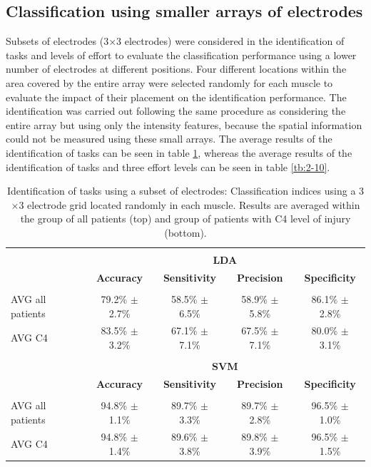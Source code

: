 \subsection{Classification using smaller arrays of electrodes}
Subsets of electrodes (3$\times$3 electrodes) were considered in the identification of tasks and levels of effort to evaluate the classification performance using a lower number of electrodes at different positions. Four different locations within the area covered by the entire array were selected randomly for each muscle to evaluate the impact of their placement on the identification performance. The identification was carried out following the same procedure as considering the entire array but using only the intensity features, because the spatial information could not be measured using these small arrays. The average results of the identification of tasks can be seen in table \ref{2-9}, whereas the average results of the identification of tasks and three effort levels can be seen in table \ref{tb:2-10}.

\begin{table}[]
\centering
\caption{Identification of tasks using a subset of electrodes: Classification indices using a 3$\times$3 electrode grid located randomly in each muscle. Results are averaged within the group of all patients (top) and group of patients with C4 level of injury (bottom).}
\label{2-9}
\begin{tabular}{lcccc}
 & & & &\\
                 & \multicolumn{4}{c}{\large{\textbf{LDA}}}                                                      \\
                 & \textbf{Accuracy}  & \textbf{Sensitivity} & \textbf{Precision} & \textbf{Specificity} \\ \hline
                 &                    &                      &                    &                      \\
AVG all patients & 79.2\% $\pm$ 2.7\% & 58.5\% $\pm$ 6.5\%   & 58.9\% $\pm$ 5.8\% & 86.1\% $\pm$ 2.8\%   \\
AVG C4           & 83.5\% $\pm$ 3.2\% & 67.1\% $\pm$ 7.1\%   & 67.5\% $\pm$ 7.1\% & 80.0\% $\pm$ 3.1\%   \\
                 &                    &                      &                    &                      \\
                 & \multicolumn{4}{c}{\large{\textbf{SVM}}}                                                      \\
                 & \textbf{Accuracy}  & \textbf{Sensitivity} & \textbf{Precision} & \textbf{Specificity} \\ \hline
                 &                    &                      &                    &                      \\
AVG all patients & 94.8\% $\pm$ 1.1\% & 89.7\% $\pm$ 3.3\%   & 89.7\% $\pm$ 2.8\% & 96.5\% $\pm$ 1.0\%   \\
AVG C4           & 94.8\% $\pm$ 1.4\% & 89.6\% $\pm$ 3.8\%   & 89.8\% $\pm$ 3.9\% & 96.5\% $\pm$ 1.5\%  
\end{tabular}
\end{table}

